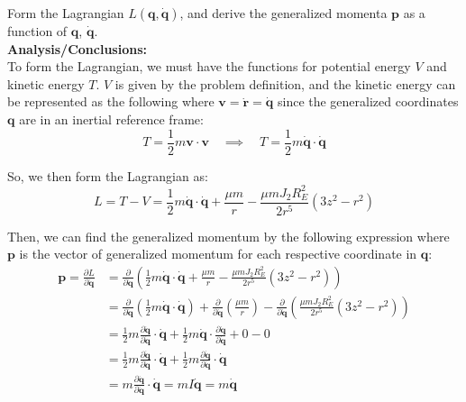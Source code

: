 \documentclass[titlepage]{article}
\begin{document}
Form the Lagrangian $L(\boldsymbol{q},\dot{\boldsymbol{q}})$, and derive the generalized momenta $\boldsymbol{p}$ as a function of $\boldsymbol{q}$, $\dot{\boldsymbol{q}}$. \\

\textbf{Analysis/Conclusions:}\\

To form the Lagrangian, we must have the functions for potential energy $V$ and kinetic energy $T$. $V$ is given by the problem definition, and the kinetic energy can be represented as the following where $\boldsymbol{v}=\dot{\boldsymbol{r}}=\dot{\boldsymbol{q}}$ since the generalized coordinates $\boldsymbol{q}$ are in an inertial reference frame:
\begin{equation}
	T=\frac{1}{2}m\boldsymbol{v}\cdot\boldsymbol{v}\quad\implies\quad T=\frac{1}{2}m\dot{\boldsymbol{q}}\cdot\dot{\boldsymbol{q}}
\end{equation}

So, we then form the Lagrangian as:
\begin{equation}
	L=T-V=\frac{1}{2}m\dot{\boldsymbol{q}}\cdot\dot{\boldsymbol{q}}+\frac{\mu m}{r}-\frac{\mu mJ_2R_E^2}{2r^5}\left(3z^2-r^2\right)
\end{equation}

Then, we can find the generalized momentum by the following expression where $\boldsymbol{p}$ is the vector of generalized momentum for each respective coordinate in $\boldsymbol{q}$:
\begin{equation}
	\begin{split}
		\boldsymbol{p}=\frac{\partial L}{\partial\dot{\boldsymbol{q}}}&=\frac{\partial}{\partial\dot{\boldsymbol{q}}}\left(\frac{1}{2}m\dot{\boldsymbol{q}}\cdot\dot{\boldsymbol{q}}+\frac{\mu m}{r}-\frac{\mu mJ_2R_E^2}{2r^5}\left(3z^2-r^2\right)\right) \\
		&=\frac{\partial}{\partial\dot{\boldsymbol{q}}}\left(\frac{1}{2}m\dot{\boldsymbol{q}}\cdot\dot{\boldsymbol{q}}\right)+\frac{\partial}{\partial\dot{\boldsymbol{q}}}\left(\frac{\mu m}{r}\right)-\frac{\partial}{\partial\dot{\boldsymbol{q}}}\left(\frac{\mu mJ_2R_E^2}{2r^5}\left(3z^2-r^2\right)\right) \\
		&=\frac{1}{2}m\frac{\partial\dot{\boldsymbol{q}}}{\partial\dot{\boldsymbol{q}}}\cdot\dot{\boldsymbol{q}}+\frac{1}{2}m\dot{\boldsymbol{q}}\cdot\frac{\partial\dot{\boldsymbol{q}}}{\partial\dot{\boldsymbol{q}}}+0-0 \\
		&=\frac{1}{2}m\frac{\partial\dot{\boldsymbol{q}}}{\partial\dot{\boldsymbol{q}}}\cdot\dot{\boldsymbol{q}}+\frac{1}{2}m\frac{\partial\dot{\boldsymbol{q}}}{\partial\dot{\boldsymbol{q}}}\cdot\dot{\boldsymbol{q}} \\
		&=m\frac{\partial\dot{\boldsymbol{q}}}{\partial\dot{\boldsymbol{q}}}\cdot\dot{\boldsymbol{q}}=mI\dot{\boldsymbol{q}}=m\dot{\boldsymbol{q}}
	\end{split}
\end{equation}
\end{document}
